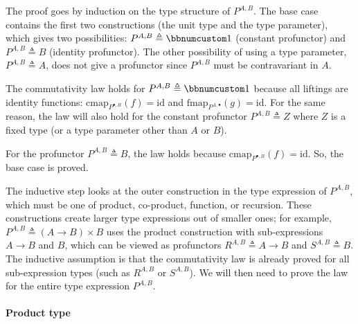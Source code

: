 The proof goes by induction on the type structure of $P^{A,B}$. The
base case contains the first two constructions (the unit type and
the type parameter), which gives two possibilities: $P^{A,B}\triangleq\bbnum 1$
(constant profunctor) and $P^{A,B}\triangleq B$ (identity profunctor).
The other possibility of using a type parameter, $P^{A,B}\triangleq A$,
does not give a profunctor since $P^{A,B}$ must be contravariant
in $A$.

The commutativity law holds for $P^{A,B}\triangleq\bbnum 1$ because
all liftings are identity functions: $\text{cmap}_{P^{\bullet,B}}(f)=\text{id}$
and $\text{fmap}_{P^{A,\bullet}}(g)=\text{id}$. For the same reason,
the law will also hold for the constant profunctor $P^{A,B}\triangleq Z$
where $Z$ is a fixed type (or a type parameter other than $A$ or
$B$).

For the profunctor $P^{A,B}\triangleq B$, the law holds because $\text{cmap}_{P^{\bullet,B}}(f)=\text{id}$.
So, the base case is proved.

The inductive step looks at the outer construction in the type expression
of $P^{A,B}$, which must be one of product, co-product, function,
or recursion. These constructions create larger type expressions out
of smaller ones; for example, $P^{A,B}\triangleq\left(A\rightarrow B\right)\times B$
uses the product construction with sub-expressions $A\rightarrow B$
and $B$, which can be viewed as profunctors $R^{A,B}\triangleq A\rightarrow B$
and $S^{A,B}\triangleq B$. The inductive assumption is that the commutativity
law is already proved for all sub-expression types (such as $R^{A,B}$
or $S^{A,B}$). We will then need to prove the law for the entire
type expression $P^{A,B}$.

\paragraph{Product type}

